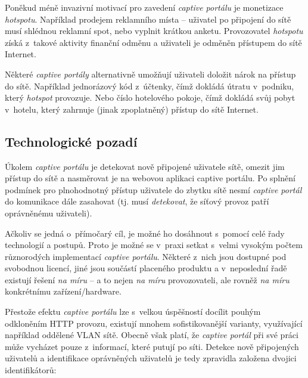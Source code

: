 \documentclass[thesis=M,czech]{FITthesis}[2012/10/20]
\begin{document}
Poněkud méně invazivní motivací pro zavedení \textit{captive portálu} je monetizace \textit{hotspotu}. Například prodejem reklamního místa -- uživatel po připojení do sítě musí shlédnou reklamní spot, nebo vyplnit krátkou anketu. Provozovatel \textit{hotspotu} získá z~takové aktivity finanční odměnu a uživateli je odměněn přístupem do sítě Internet.

Některé \textit{captive portály} alternativně umožňují uživateli doložit nárok na přístup do sítě. Například jednorázový kód z~účtenky, čímž dokládá útratu v~podniku, který \textit{hotspot} provozuje. Nebo číslo hotelového pokoje, čímž dokládá svůj pobyt v~hotelu, který zahrnuje (jinak zpoplatněný) přístup do sítě Internet.

\subsection{Technologické pozadí}
\label{subsec:technologicke-pozadi}


Úkolem \textit{captive portálu} je detekovat nově připojené uživatele sítě, omezit jim přístup do sítě a nasměrovat je na webovou aplikaci captive portálu. Po splnění podmínek pro plnohodnotný přístup uživatele do zbytku sítě nesmí \textit{captive portál} do komunikace dále zasahovat (tj. musí \textit{detekovat}, že síťový provoz patří oprávněnému uživateli).

Ačkoliv se jedná o~přímočarý cíl, je možné ho dosáhnout s~pomocí celé řady technologií a postupů. Proto je možné se v~praxi setkat s~velmi vysokým počtem různorodých implementací \textit{captive portálu}. Některé z~nich jsou dostupné pod svobodnou licencí, jiné jsou součástí placeného produktu a v~neposlední řadě existují řešení \textit{na míru} -- a to nejen \textit{na míru} provozovateli, ale rovněž \textit{na míru} konkrétnímu zařízení/hardware. 

Přestože efektu \textit{captive portálu} lze s~velkou úspěšností docílit pouhým odkloněním HTTP provozu, existují mnohem sofistikovanější varianty, využívající například oddělené VLAN sítě. Obecně však platí, že \textit{captive portál} při své práci může vycházet pouze z~informací, které putují po síti. Detekce nově připojených uživatelů a identifikace oprávněných uživatelů je tedy zpravidla založena dvojici identifikátorů:
\end{document}
